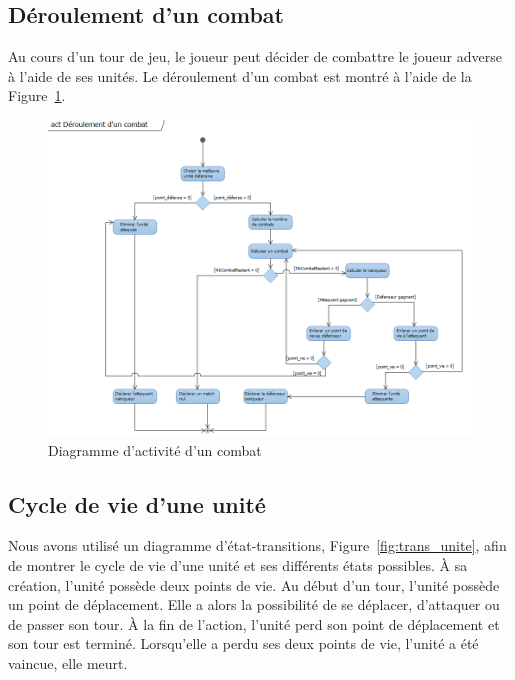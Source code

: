 \documentclass[a4paper]{article}%
\begin{document}
\subsection{Déroulement d'un combat}
Au cours d'un tour de jeu, le joueur peut décider de combattre le joueur adverse à l'aide de ses unités. Le déroulement d'un combat est montré à l'aide de la Figure~\ref{fig:inter_combat}.

\begin{figure}[H]
    \centering
    \includegraphics[width=\textwidth]{./images/interaction/combat.png}
		\caption{Diagramme d'activité d'un combat}
		\label{fig:inter_combat}
\end{figure}

\subsection{Cycle de vie d'une unité}
Nous avons utilisé un diagramme d'état-transitions, Figure~\ref{fig:trans_unite}, afin de montrer le cycle de vie d'une unité et ses différents états possibles.
\`A sa création, l'unité possède deux points de vie. 
Au début d'un tour, l'unité possède un point de déplacement. Elle a alors la possibilité de se déplacer, d'attaquer ou de passer son tour. \`A la fin de l'action, l'unité perd son point de déplacement et son tour est terminé.
Lorsqu'elle a perdu ses deux points de vie, l'unité a été vaincue, elle meurt.
\end{document}
